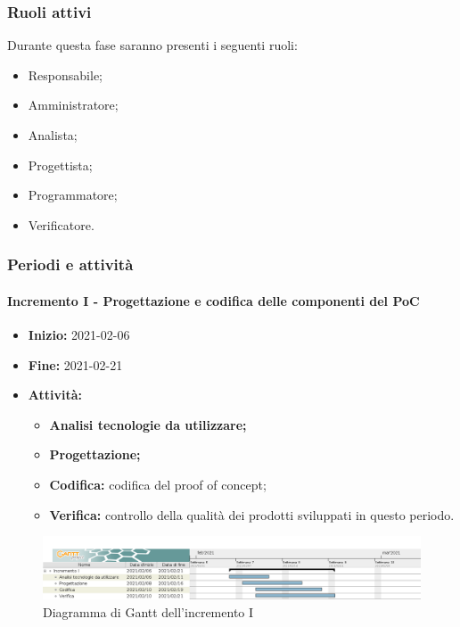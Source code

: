 \subsubsection{Ruoli attivi}
Durante questa fase saranno presenti i seguenti ruoli:
\begin{itemize}
    \item Responsabile;
    \item Amministratore;
    \item Analista;
    \item Progettista;
    \item Programmatore;
    \item Verificatore.
\end{itemize}

\subsubsection{Periodi e attività}

\paragraph[Incremento I]{Incremento I - \textnormal{Progettazione e codifica delle componenti del PoC}}
\begin{itemize}
    \item [] \textbf{Inizio:} 2021-02-06
    \item [] \textbf{Fine:} 2021-02-21
    \item [] \textbf{Attività:}
          \begin{itemize}
              \item \textbf{Analisi tecnologie da utilizzare;}
              \item \textbf{Progettazione;}
              \item \textbf{Codifica:} codifica del proof of concept;
              \item \textbf{Verifica:} controllo della qualità dei prodotti sviluppati in questo periodo.
          \end{itemize}
\end{itemize}

\begin{figure}[H]
    \centering
    \includegraphics[width=1\linewidth]{res/images/pianificazione/incremento_1.png}
    \caption{Diagramma di Gantt dell'incremento I}
    \label{fig:_Gantt incremento I}
\end{figure}

